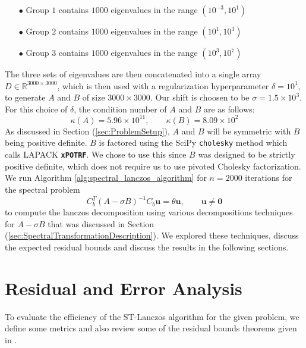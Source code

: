 \begin{itemize}
    \item[$\bullet$] Group $1$ contains $1000$ eigenvalues in the range $(10^{-3}, 10^{1})$
    \item[$\bullet$] Group $2$ contains $1000$ eigenvalues in the range $(10^1, 10^3)$
    \item[$\bullet$] Group $3$ contains $1000$ eigenvalues in the range $(10^3, 10^7)$
\end{itemize}

The three sets of eigenvalues are then concatenated into a single array $D \in \mathbb{R}^{3000 \times 3000}$, which is then used with a regularization hyperparameter $\delta = 10^{1}$, to generate $A$ and $B$ of size $3000 \times 3000$. Our shift is choosen to be $\sigma = 1.5 \times 10^3$. For this choice of $\delta$, the condition number of $A$ and $B$ are as follows:
\begin{equation*}
    \kappa(A) = 5.96 \times 10^{11}, \qquad \kappa(B) = 8.09 \times 10^2
\end{equation*}
As discussed in Section (\ref{sec:ProblemSetup}), $A$ and $B$ will be symmetric with $B$ being positive definite. $B$ is factored using the SciPy \texttt{cholesky} method which calls LAPACK \textbf{\texttt{xPOTRF}}. We chose to use this since $B$ was designed to be strictly positive definite, which does not require us to use  pivoted Cholesky factorization. We run Algorithm \ref{alg:spectral_lanczos_algorithm} for $n=2000$ iterations for the spectral problem
\begin{equation}\label{eq:ShiftedInvertedProblem2}
	C_b^T (A-\sigma B)^{-1} C_b \mathbf{u} = \theta \mathbf{u}, \qquad \mathbf{u} \neq \mathbf{0}
\end{equation}
to compute the lanczos decomposition using various decompositions techniques for $A - \sigma B$ that was discussed in Section (\ref{sec:SpectralTransformationDescription}). We explored these techniques, discuss the expected residual bounds and discuss the results in the following sections.

\section{Residual and Error Analysis}
To evaluate the efficiency of the ST-Lanczos algorithm for the given problem, we define some metrics and also review some of the residual bounds theorems given in \cite{stewart2024spectraltransformationdensesymmetric}.

